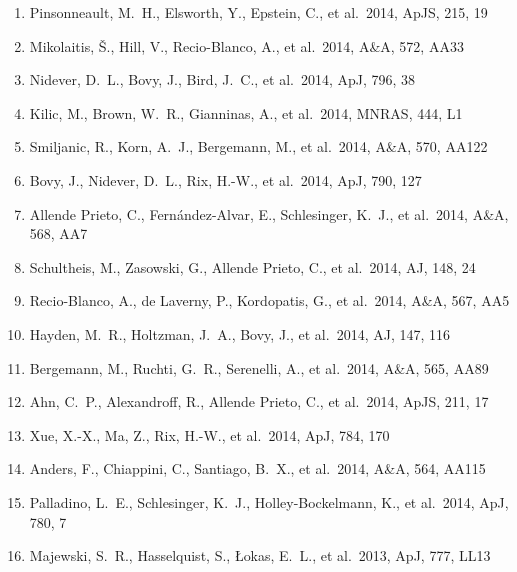 \documentclass[12pt]{article}
\begin{document}
\begin{enumerate}
\item Pinsonneault, 
M.~H., Elsworth, Y., Epstein, C., et al.\ 2014, ApJS, 215, 19 


\item Mikolaitis, {\v S}., Hill, V., Recio-Blanco, A., et al.\ 2014, A\&A, 572, AA33 


\item Nidever, D.~L., Bovy, 
J., Bird, J.~C., et al.\ 2014, ApJ, 796, 38 


\item Kilic, M., Brown, W.~R., 
Gianninas, A., et al.\ 2014, MNRAS, 444, L1 


\item Smiljanic, R., Korn, A.~J., Bergemann, M., et al.\ 2014, A\&A, 570, AA122 


\item Bovy, J., Nidever, D.~L., 
Rix, H.-W., et al.\ 2014, ApJ, 790, 127 


\item Allende Prieto, C., Fern{\'a}ndez-Alvar, E., Schlesinger, K.~J., et al.\ 2014, A\&A, 568, AA7 


\item Schultheis, M., 
Zasowski, G., Allende Prieto, C., et al.\ 2014, AJ, 148, 24 


\item Recio-Blanco, A., de Laverny, P., Kordopatis, G., et al.\ 2014, A\&A, 567, AA5 


\item Hayden, M.~R., Holtzman, 
J.~A., Bovy, J., et al.\ 2014, AJ, 147, 116 


\item Bergemann, M., Ruchti, G.~R., Serenelli, A., et al.\ 2014, A\&A, 565, AA89 


\item Ahn, C.~P., Alexandroff, 
R., Allende Prieto, C., et al.\ 2014, ApJS, 211, 17 


\item Xue, X.-X., Ma, Z., Rix, 
H.-W., et al.\ 2014, ApJ, 784, 170 


\item Anders, F., Chiappini, C., Santiago, B.~X., et al.\ 2014, A\&A, 564, AA115 


\item Palladino, L.~E., 
Schlesinger, K.~J., Holley-Bockelmann, K., et al.\ 2014, ApJ, 780, 7 


\item Majewski, S.~R., 
Hasselquist, S., {\L}okas, E.~L., et al.\ 2013, ApJ, 777, LL13 



\end{enumerate}
\end{document}
